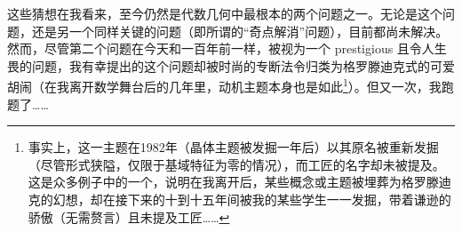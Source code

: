 这些猜想在我看来，至今仍然是代数几何中最根本的两个问题之一。无论是这个问题，还是另一个同样关键的问题（即所谓的“奇点解消”问题），目前都尚未解决。然而，尽管第二个问题在今天和一百年前一样，被视为一个 prestigious 且令人生畏的问题，我有幸提出的这个问题却被时尚的专断法令归类为格罗滕迪克式的可爱胡闹（在我离开数学舞台后的几年里，动机主题本身也是如此\footnote{事实上，这一主题在1982年（晶体主题被发掘一年后）以其原名被重新发掘（尽管形式狭隘，仅限于基域特征为零的情况），而工匠的名字却未被提及。这是众多例子中的一个，说明在我离开后，某些概念或主题被埋葬为格罗滕迪克的幻想，却在接下来的十到十五年间被我的某些学生一一发掘，带着谦逊的骄傲（无需赘言）且未提及工匠……}）。但又一次，我跑题了……